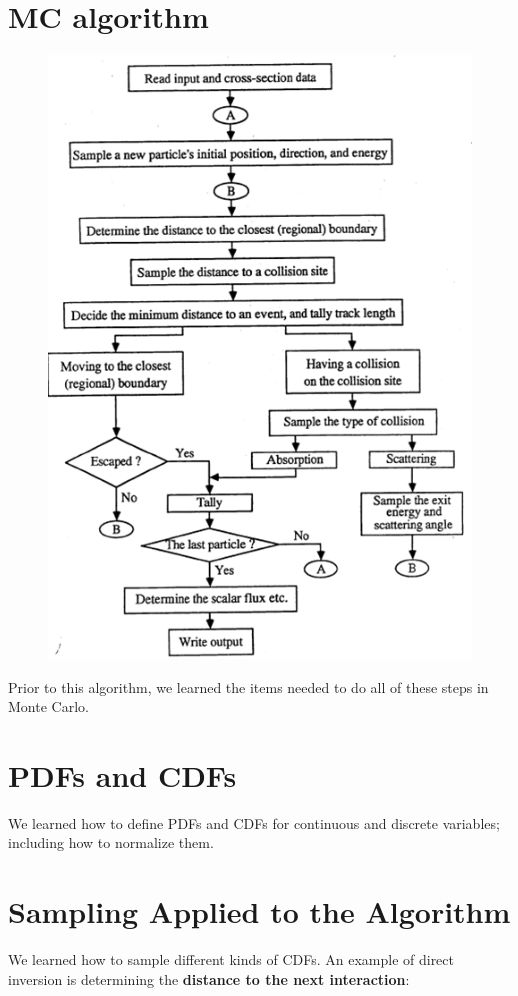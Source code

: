 \documentclass[12pt]{article}
\begin{document}
\section{MC algorithm}
\begin{figure}[h]
\begin{center}
  \includegraphics[height=6 in,clip]{MC/MC-algorithm}
  \end{center}
\end{figure}

Prior to this algorithm, we learned the items needed to do all of these steps in Monte Carlo.


\section{PDFs and CDFs}
We learned how to define PDFs and CDFs for continuous and discrete variables; including how to normalize them. 


\section{Sampling Applied to the Algorithm}
We learned how to sample different kinds of CDFs. An example of direct inversion is determining the \textbf{distance to the next interaction}:
\end{document}
